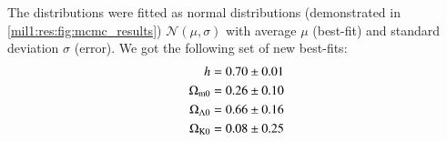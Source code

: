     The distributions were fitted as normal distributions (demonstrated in \cref{mil1:res:fig:mcmc_results}) $\mathcal{N}(\mu, \sigma)$ with average $\mu$ (best-fit) and standard deviation $\sigma$ (error). We got the following set of new best-fits:
    \begin{equation}
        \begin{split}
            h &= 0.70 \pm 0.01 \\
            \Omega_{\mathrm{m}0} &= 0.26 \pm 0.10 \\
            \Omega_{\mathrm{\Lambda}0} &= 0.66 \pm 0.16 \\
            \Omega_{\mathrm{K}0} &= 0.08 \pm 0.25
        \end{split}
    \end{equation}

    